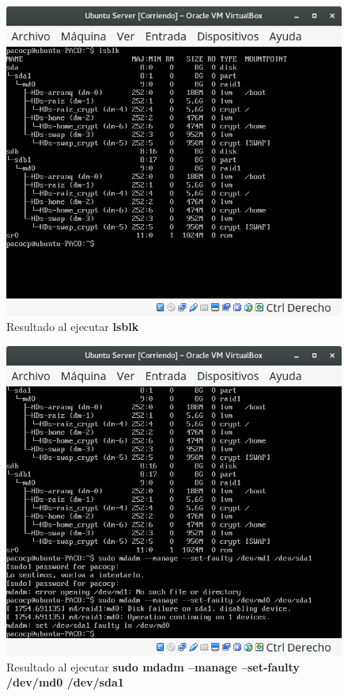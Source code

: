 \begin{figure}[H] %
	\centering
	\includegraphics[scale=0.5]{figuras/figura4.png}  %
	
	
	\caption{Resultado al ejecutar \textbf{lsblk}}
	\label{figura4}
\end{figure}

\begin{figure}[H] %
	\centering
	\includegraphics[scale=0.5]{figuras/figura5.png}  %
	
	
	\caption{Resultado al ejecutar \textbf{sudo mdadm --manage --set-faulty /dev/md0 /dev/sda1}}
	\label{figura5}
\end{figure}

